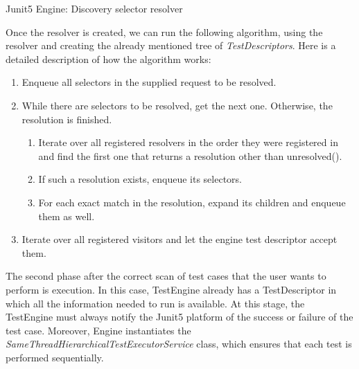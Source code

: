 \begin{algorithm}[H]
    \label{02:alg:selectorresolver}
    \caption{Junit5 Engine: Discovery selector resolver}
    \begin{algorithmic}[1]
		\EndProcedure
    \end{algorithmic}
\end{algorithm}

Once the resolver is created, we can run the following algorithm, using the resolver and creating the already mentioned tree of \emph{TestDescriptors}.
Here is a detailed description of how the algorithm works:

\begin{enumerate}[itemsep=1mm, parsep=0pt]
    \item Enqueue all selectors in the supplied request to be resolved.
    \item While there are selectors to be resolved, get the next one.
    Otherwise, the resolution is finished.
    \begin{enumerate}
        \item Iterate over all registered resolvers in the order they were registered in and find the first one that returns a resolution other than unresolved().
        \item If such a resolution exists, enqueue its selectors.
        \item For each exact match in the resolution, expand its children and enqueue them as well.
    \end{enumerate}
    \item Iterate over all registered visitors and let the engine test descriptor accept them.
\end{enumerate}

The second phase after the correct scan of test cases that the user wants to perform is execution.
In this case, TestEngine already has a TestDescriptor in which all the information needed to run is available.
At this stage, the TestEngine must always notify the Junit5 platform of the success or failure of the test case.
Moreover, Engine instantiates the \emph{SameThreadHierarchicalTestExecutorService} class, which ensures that each test is performed sequentially.

